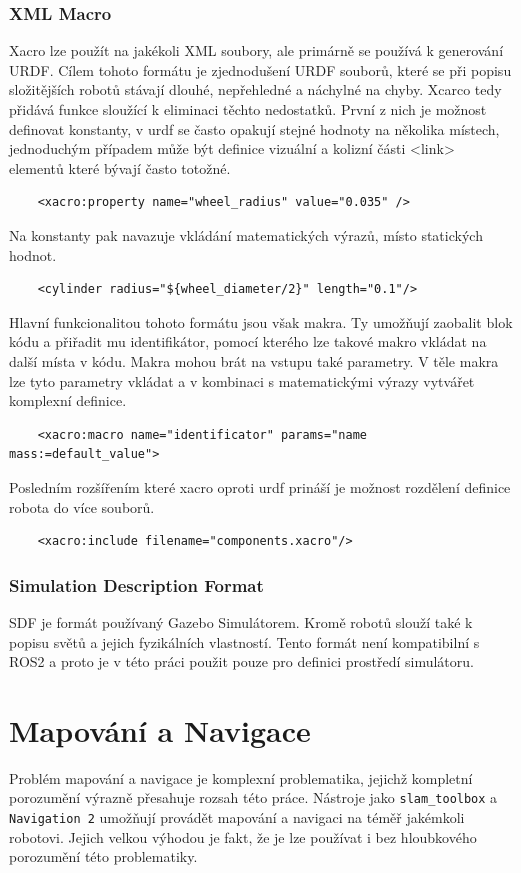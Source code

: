 \subsubsection*{XML Macro}
Xacro lze použít na jakékoli XML soubory, ale primárně se používá k generování URDF. Cílem tohoto formátu je zjednodušení URDF souborů, které se při popisu složitějších robotů stávají dlouhé, nepřehledné a náchylné na chyby. Xcarco tedy přidává funkce sloužící k eliminaci těchto nedostatků. 
První z nich je možnost definovat konstanty, v urdf se často opakují stejné hodnoty na několika místech, jednoduchým případem může být definice vizuální a kolizní části <link> elementů které bývají často totožné. \cite{ros2_documentation} 
\begin{verbatim}
	<xacro:property name="wheel_radius" value="0.035" />
\end{verbatim}
Na konstanty pak navazuje vkládání matematických výrazů, místo statických hodnot.
\begin{verbatim}
	<cylinder radius="${wheel_diameter/2}" length="0.1"/>
\end{verbatim}
Hlavní funkcionalitou tohoto formátu jsou však makra. Ty umožňují zaobalit blok kódu a přiřadit mu identifikátor, pomocí kterého lze takové makro vkládat na další místa v kódu. 
Makra mohou brát na vstupu také parametry. V těle makra lze tyto parametry vkládat a v kombinaci s matematickými výrazy vytvářet komplexní definice.
\begin{verbatim}
	<xacro:macro name="identificator" params="name mass:=default_value">
\end{verbatim}
Posledním rozšířením které xacro oproti urdf prináší je možnost rozdělení definice robota do více souborů.
\begin{verbatim}
	<xacro:include filename="components.xacro"/>
\end{verbatim} 

\subsubsection*{Simulation Description Format}
SDF je formát používaný Gazebo Simulátorem. Kromě robotů slouží také k popisu světů a jejich fyzikálních vlastností. Tento formát není kompatibilní s ROS2 a proto je v této práci použit pouze pro definici prostředí simulátoru.

\section{Mapování a Navigace}
Problém mapování a navigace je komplexní problematika, jejichž kompletní porozumění výrazně přesahuje rozsah této práce. Nástroje jako \verb|slam_toolbox| a \verb|Navigation 2| umožňují provádět mapování a navigaci na téměř jakémkoli robotovi. Jejich velkou výhodou je fakt, že je lze používat i bez hloubkového porozumění této problematiky.

